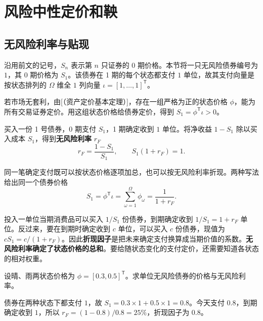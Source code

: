 \section{风险中性定价和鞅}\label{sec:wj-four-risk-neutral}
\subsection{无风险利率与贴现}
沿用前文的记号，$S_n$ 表示第 $n$ 只证券的 0 期价格。本节将一只无风险债券编号为 $1$，其 0 期价格为 $S_1$。该债券在 1 期的每个状态都支付 $1$ 单位，故其支付向量是按状态排列的 $\Omega$ 维全 $1$ 列向量 $\iota=[1,\ldots,1]^{\mathsf T}$。

若市场无套利，由[（资产定价基本定理）]，存在一组严格为正的状态价格 $\phi$，能为所有交易证券定价。用这组状态价格给债券定价，得到 $S_1=\phi^{\mathsf T}\iota>0$。

\begin{tcolorbox}[knowledge,title=无风险利率与折现因子]
买入一份 1 号债券，0 期支付 $S_1$，1 期确定收到 $1$ 单位。将净收益 $1-S_1$ 除以买入成本 $S_1$，得到\textbf{无风险利率} $r_F$
\[
    r_F=\frac{1-S_1}{S_1},\qquad S_1(1+r_F)=1.
\]

同一笔确定支付既可以按状态价格逐项加总，也可以按无风险利率折现。两种写法给出同一个债券价格
\begin{equation}
    S_1=\phi^{\mathsf T}\iota
       =\sum_{\omega=1}^{\Omega}\phi_{\omega}
       =\frac{1}{1+r_F}.
 \label{eq:wj-four-7}
\end{equation}
\end{tcolorbox}

投入一单位当期消费品可以买入 $1/S_1$ 份债券，到期确定收到 $1/S_1=1+r_F$ 单位。反过来，要在到期时确定收到 $c$ 单位，可以买入 $c$ 份债券，现值为 $cS_1=c/(1+r_F)$。因此\textbf{折现因子}是把未来确定支付换算成当期价值的系数。\textbf{无风险利率确定了状态价格的总和}。要给随状态变化的支付定价，还需要知道各状态的相对权重。

\begin{tcolorbox}[example,title=课堂例题：从状态价格读出利率]
\begin{question}
设晴、雨两状态价格为 $\phi=[0.3,0.5]^{\mathsf T}$。求单位无风险债券的价格与无风险利率。
\end{question}
\begin{solution}
债券在两种状态下都支付 $1$，故 $S_1=0.3\times1+0.5\times1=0.8$。今天支付 $0.8$，到期确定收到 $1$，所以 $r_F=(1-0.8)/0.8=25\%$，折现因子为 $0.8$。
\end{solution}
\end{tcolorbox}


